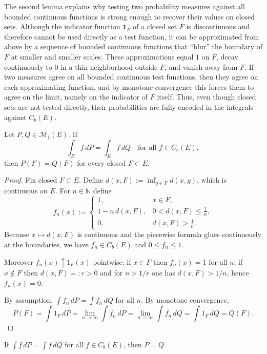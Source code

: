 The second lemma explains why testing two probability measures against all bounded continuous functions is strong enough to recover their values on closed sets.
Although the indicator function $\mathbf{1}_F$ of a closed set $F$ is discontinuous and therefore cannot be used directly as a test function,
it can be approximated from above by a sequence of bounded continuous functions that ``blur'' the boundary of $F$ at smaller and smaller scales.
These approximations equal $1$ on $F$, decay continuously to $0$ in a thin neighborhood outside $F$, and vanish away from $F$.
If two measures agree on all bounded continuous test functions, then they agree on each approximating function, and by monotone convergence this forces them to agree on the limit, namely on the indicator of $F$ itself.
Thus, even though closed sets are not tested directly, their probabilities are fully encoded in the integrals against $C_b(E)$.


\begin{lemma}
\label{lem:approx_closed}
Let $P,Q\in\mathcal{M}_1(E)$. If
\[
\int_E f\,dP=\int_E f\,dQ\quad\text{for all }f\in C_b(E),
\]
then $P(F)=Q(F)$ for every closed $F\subset E$.
\end{lemma}

\begin{proof}
Fix closed $F\subset E$. Define $d(x,F):=\inf_{y\in F} d(x,y)$, which is continuous on $E$.
For $n\in\mathbb{N}$ define
\[
f_n(x):=\begin{cases}
1, & x\in F,\\[2pt]
1-n\,d(x,F), & 0<d(x,F)\le \frac1n,\\[2pt]
0, & d(x,F)>\frac1n.
\end{cases}
\]
Because $x\mapsto d(x,F)$ is continuous and the piecewise formula glues continuously at the boundaries,
we have $f_n\in C_b(E)$ and $0\le f_n\le 1$.

Moreover $f_n(x)\uparrow 1_{F}(x)$ pointwise:
if $x\in F$ then $f_n(x)=1$ for all $n$; if $x\notin F$ then $d(x,F)=:r>0$ and for $n>1/r$ one has $d(x,F)>1/n$, hence $f_n(x)=0$.

By assumption, $\int f_n\,dP=\int f_n\,dQ$ for all $n$. By monotone convergence,
\[
P(F)=\int 1_{F}\,dP=\lim_{n\to\infty}\int f_n\,dP
=\lim_{n\to\infty}\int f_n\,dQ=\int 1_{F}\,dQ=Q(F).
\]
\end{proof}

\begin{corollary}
If $\int f\,dP=\int f\,dQ$ for all $f\in C_b(E)$, then $P=Q$.
\end{corollary}

